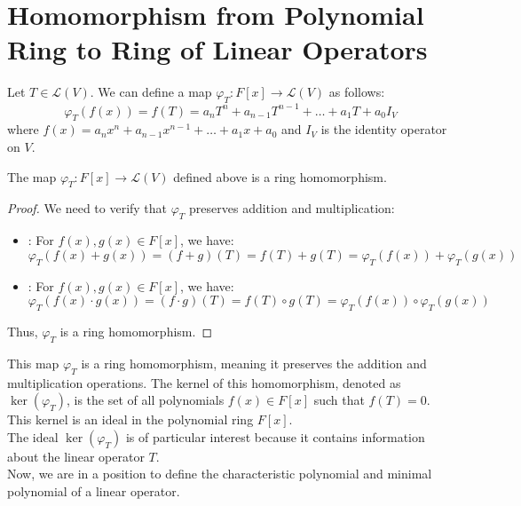 \documentclass[openany]{book}
\begin{document}
\section{Homomorphism from Polynomial Ring to Ring of Linear Operators}
Let $T \in \mathcal{L}(V)$. We can define a map $\varphi_T: F[x] \to \mathcal{L}(V)$ as follows:
\[\varphi_T(f(x)) = f(T) = a_n T^n + a_{n-1} T^{n-1} + \ldots + a_1 T + a_0 I_V\]
where $f(x) = a_n x^n + a_{n-1} x^{n-1} + \ldots + a_1 x + a_0$ and $I_V$ is the identity operator on $V$. \\
\begin{mytheorem}
The map $\varphi_T: F[x] \to \mathcal{L}(V)$ defined above is a ring homomorphism.
\end{mytheorem}
\begin{proof}
We need to verify that $\varphi_T$ preserves addition and multiplication:
\begin{itemize}
    \item {}: For $f(x), g(x) \in F[x]$, we have:
    \[\varphi_T(f(x) + g(x)) = (f + g)(T) = f(T) + g(T) = \varphi_T(f(x)) + \varphi_T(g(x))\]
    \item {}: For $f(x), g(x) \in F[x]$, we have:
    \[\varphi_T(f(x) \cdot g(x)) = (f \cdot g)(T) = f(T) \circ g(T) = \varphi_T(f(x)) \circ \varphi_T(g(x))\]
\end{itemize}
Thus, $\varphi_T$ is a ring homomorphism.
\end{proof}
This map $\varphi_T$ is a ring homomorphism, meaning it preserves the addition and multiplication operations. The kernel of this homomorphism, denoted as $\ker(\varphi_T)$, is the set of all polynomials $f(x) \in F[x]$ such that $f(T) = 0$. This kernel is an ideal in the polynomial ring $F[x]$. \\
The ideal $\ker(\varphi_T)$ is of particular interest because it contains information about the linear operator $T$. \\ 
Now, we are in a position to define the characteristic polynomial and minimal polynomial of a linear operator.
\end{document}
